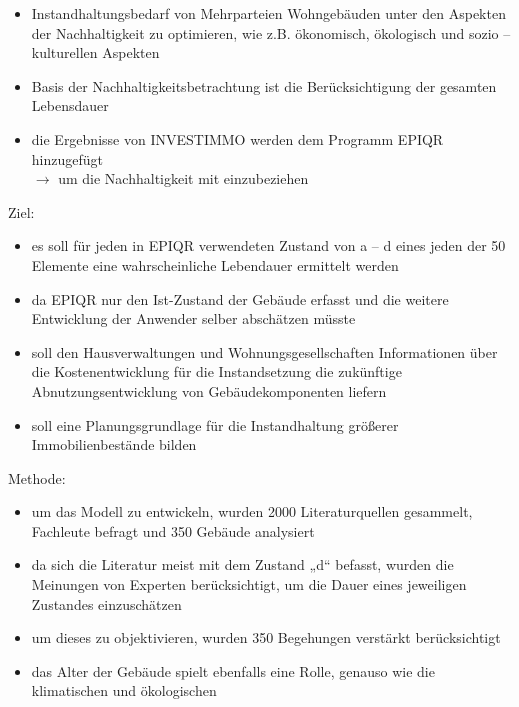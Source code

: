 \documentclass[fleqn,twoside,dvipsnames]{article}
\begin{document}
\begin{itemize}
\begin{itemize}
\begin{itemize}
                                \item Instandhaltungsbedarf von Mehrparteien Wohngebäuden unter den Aspekten der Nachhaltigkeit zu optimieren, wie z.B. ökonomisch, ökologisch und sozio – kulturellen Aspekten
                                \item Basis der Nachhaltigkeitsbetrachtung ist die Berücksichtigung der gesamten Lebensdauer
                                \item die Ergebnisse von INVESTIMMO werden dem Programm EPIQR hinzugefügt\\
                                    $\rightarrow$ um die Nachhaltigkeit mit einzubeziehen
                            \end{itemize}    
                        Ziel:
                            \begin{itemize}
                                \item es soll für jeden in EPIQR verwendeten Zustand von a – d eines jeden der 50 Elemente eine wahrscheinliche Lebendauer ermittelt werden
                                \item da EPIQR nur den Ist-Zustand der Gebäude erfasst und die weitere Entwicklung der Anwender selber abschätzen müsste
                                \item soll den Hausverwaltungen und Wohnungsgesellschaften Informationen über die Kostenentwicklung für die Instandsetzung die zukünftige Abnutzungsentwicklung von Gebäudekomponenten liefern
                                \item soll eine Planungsgrundlage für die Instandhaltung größerer Immobilienbestände bilden
                            \end{itemize}
                        Methode:
                            \begin{itemize}
                                \item um das Modell zu entwickeln, wurden 2000 Literaturquellen gesammelt, Fachleute befragt und 350 Gebäude analysiert
                                \item da sich die Literatur meist mit dem Zustand „d“ befasst, wurden die Meinungen von Experten berücksichtigt, um die Dauer eines jeweiligen Zustandes einzuschätzen
                                \item um dieses zu objektivieren, wurden 350 Begehungen verstärkt berücksichtigt
                                \item das Alter der Gebäude spielt ebenfalls eine Rolle, genauso wie die klimatischen und ökologischen 

\end{itemize}
\end{itemize}
\end{itemize}
\end{document}
